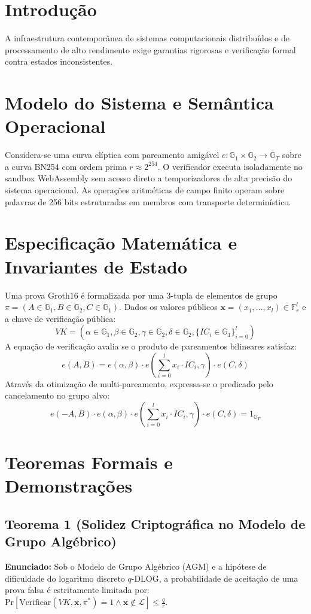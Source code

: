 \documentclass[
  article,
  12pt,
  oneside,
  a4paper,
  english,
  brazil
]{abntex2}
\begin{document}
\section{Introdução}
A infraestrutura contemporânea de sistemas computacionais distribuídos e de processamento de alto rendimento exige garantias rigorosas e verificação formal contra estados inconsistentes.

\section{Modelo do Sistema e Semântica Operacional}
Considera-se uma curva elíptica com pareamento amigável $e: \mathbb{G}_1 \times \mathbb{G}_2 \to \mathbb{G}_T$ sobre a curva BN254 com ordem prima $r \approx 2^{254}$. O verificador executa isoladamente no sandbox WebAssembly sem acesso direto a temporizadores de alta precisão do sistema operacional. As operações aritméticas de campo finito operam sobre palavras de 256 bits estruturadas em membros com transporte determinístico.

\section{Especificação Matemática e Invariantes de Estado}
Uma prova Groth16 é formalizada por uma 3-tupla de elementos de grupo $\pi = (A \in \mathbb{G}_1, B \in \mathbb{G}_2, C \in \mathbb{G}_1)$.
Dados os valores públicos $\mathbf{x} = (x_1, \dots, x_l) \in \mathbb{F}_r^l$ e a chave de verificação pública:
$$VK = \left( \alpha \in \mathbb{G}_1, \beta \in \mathbb{G}_2, \gamma \in \mathbb{G}_2, \delta \in \mathbb{G}_2, \{IC_i \in \mathbb{G}_1\}_{i=0}^l \right)$$
A equação de verificação avalia se o produto de pareamentos bilineares satisfaz:
$$e(A, B) = e(\alpha, \beta) \cdot e\left( \sum_{i=0}^l x_i \cdot IC_i, \gamma \right) \cdot e(C, \delta)$$
Através da otimização de multi-pareamento, expressa-se o predicado pelo cancelamento no grupo alvo:
$$e(-A, B) \cdot e(\alpha, \beta) \cdot e\left( \sum_{i=0}^l x_i \cdot IC_i, \gamma \right) \cdot e(C, \delta) = 1_{\mathbb{G}_T}$$

\section{Teoremas Formais e Demonstrações}
\subsection{Teorema 1 (Solidez Criptográfica no Modelo de Grupo Algébrico)}
\textbf{Enunciado:} Sob o Modelo de Grupo Algébrico (AGM) e a hipótese de dificuldade do logaritmo discreto $q$-DLOG, a probabilidade de aceitação de uma prova falsa é estritamente limitada por: $\text{Pr}[\text{Verificar}(VK, \mathbf{x}, \pi^*) = 1 \wedge \mathbf{x} \notin \mathcal{L}] \le \frac{q}{r}$.
\end{document}
